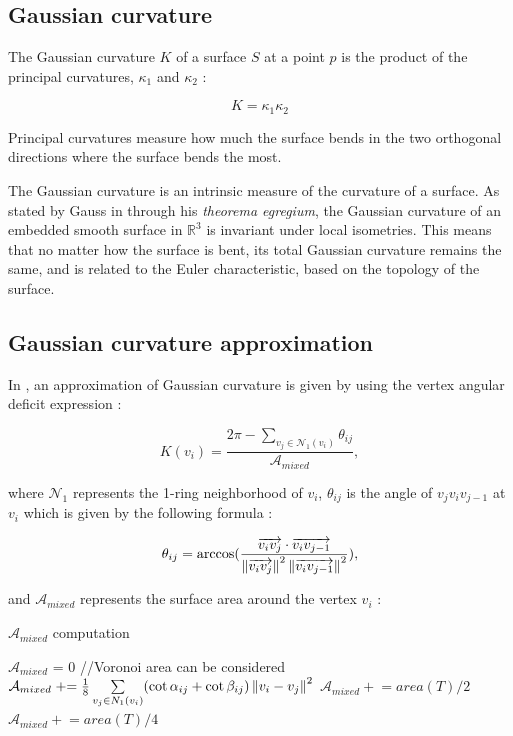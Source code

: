 \documentclass[11pt,fleqn]{book} %
\begin{document}
\begin{appendices}
\section{Gaussian curvature}
\label{sec:gaussian_curvature}
The Gaussian curvature $K$ of a surface $S$ at a point $p$ is the product of the principal curvatures, $\kappa_1$ and $\kappa_2$ :

\begin{equation}
	K = \kappa_1\kappa_2
\end{equation}

Principal curvatures measure how much the surface bends in the two orthogonal directions where the surface bends the most.

The Gaussian curvature is an intrinsic measure of the curvature of a surface. 
As stated by Gauss in \cite{Gau28} through his \textit{theorema egregium}, the Gaussian curvature of an embedded smooth surface in $\mathbb{R}^3$ is invariant under local isometries.
This means that no matter how the surface is bent, its total Gaussian curvature remains the same, and is related to the Euler characteristic, based on the topology of the surface.

\subsection{Gaussian curvature approximation}
In \cite{MMPB02}, an approximation of Gaussian curvature is given by using the vertex angular deficit expression :

\begin{equation}
	K(v_i) = \frac{2\pi -\sum_{v_j \in \mathcal{N}_1(v_i)} \theta_{ij}}{\mathcal{A}_{mixed}},
\end{equation}

where $\mathcal{N}_1$ represents the 1-ring neighborhood of $v_i$, $\theta_{ij}$ is the angle of $v_jv_iv_{j-1}$ at $v_i$ which is given by the following formula : 

\begin{equation}
	\theta_{ij} = \arccos(\frac{\overrightarrow{v_iv_j} \cdot \overrightarrow{v_i v_{j-1}}}
	{\left\lVert\overrightarrow{v_iv_j}\right\rVert^2\left\lVert\overrightarrow{v_iv_{j-1}}\right\rVert^2}),
\end{equation} 

and $\mathcal{A}_{mixed}$ represents the surface area around the vertex $v_i$ : 

\begin{algorithm}
\caption{$\mathcal{A}_{mixed}$ computation}
\begin{algorithmic}
\State $\mathcal{A}_{mixed}$ = 0
		//Voronoi area can be considered
		\State $\mathcal{A}_{mixed} \mathrel{+}= \frac{1}{8} \sum\limits_{v_j \in N_1(v_i)} (\cot \alpha_{ij} + \cot \beta_{ij}) \left\lVert v_i-v_j\right\rVert^2$
	\Else
			\State $\mathcal{A}_{mixed} \mathrel{+}= area(T)/2$
		\Else
			\State $\mathcal{A}_{mixed} \mathrel{+}= area(T)/4$
		\EndIf
	\EndIf
\EndFor
\end{algorithmic}
\end{algorithm}


\end{appendices}
\end{document}
